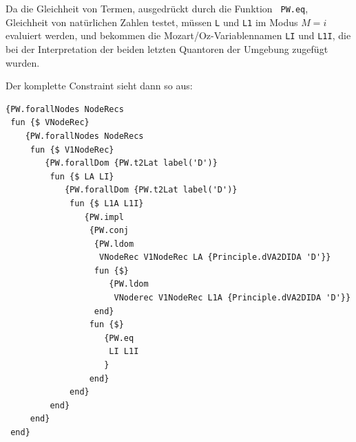 Da die Gleichheit von Termen, ausgedr\"uckt durch die Funktion {\tt
  PW.eq}, Gleichheit von nat\"urlichen Zahlen testet, m\"ussen {\tt L}
und {\tt L1} im Modus $M=i$ evaluiert werden, und bekommen die
Mozart/Oz-Variablennamen {\tt LI} und {\tt L1I}, die bei der
Interpretation der beiden letzten Quantoren der Umgebung zugef\"ugt
wurden.

Der komplette Constraint sieht dann so aus:
\begin{verbatim}
{PW.forallNodes NodeRecs
 fun {$ VNodeRec}
    {PW.forallNodes NodeRecs
     fun {$ V1NodeRec}
        {PW.forallDom {PW.t2Lat label('D')}
         fun {$ LA LI}
            {PW.forallDom {PW.t2Lat label('D')}
             fun {$ L1A L1I}
                {PW.impl
                 {PW.conj
                  {PW.ldom
                   VNodeRec V1NodeRec LA {Principle.dVA2DIDA 'D'}}
                  fun {$}
                     {PW.ldom
                      VNoderec V1NodeRec L1A {Principle.dVA2DIDA 'D'}}
                  end}
                 fun {$}
                    {PW.eq
                     LI L1I
                    }
                 end}
             end}
         end}
     end}
 end}
\end{verbatim}

